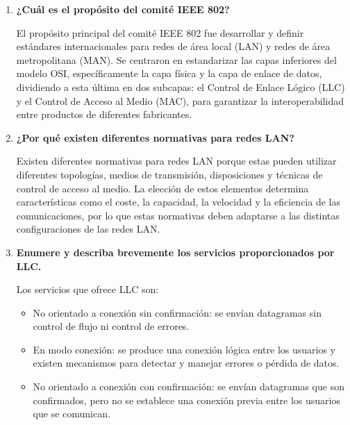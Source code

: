 \documentclass[11pt,a4paper]{article}
\begin{document}
\begin{enumerate}[label=15.\arabic*), itemsep=0.3cm]
\begin{itemize}
    \item \textbf{Estrella (Star):} Cada estación se conecta directamente a un nodo central de control mediante un enlace dedicado punto a punto. La comunicación entre dos estaciones se realiza obligatoriamente a través del dispositivo central, encargado de retransmitir el tráfico entrante hacia la línea del destinatario correspondiente.
    
    \item \textbf{Árbol (Tree):} Es una generalización de la topología en bus. El medio de transmisión es un cable ramificado sin bucles cerrados que comienza en un punto central llamado raíz. Las transmisiones emitidas por cualquier estación se propagan a través del medio a todas las ramas del árbol y pueden ser escuchadas por el resto de los dispositivos conectados.
\end{itemize}

  \item
  \textbf{¿Cuál es el propósito del comité IEEE 802?}

El propósito principal del comité IEEE 802 fue desarrollar y definir estándares internacionales para redes de área local (LAN) y redes de área metropolitana (MAN). Se centraron en estandarizar las capas inferiores del modelo OSI, específicamente la capa física y la capa de enlace de datos, dividiendo a esta última en dos subcapas: el Control de Enlace Lógico (LLC) y el Control de Acceso al Medio (MAC), para garantizar la interoperabilidad entre productos de diferentes fabricantes.

\item
\textbf{¿Por qué existen diferentes normativas para redes LAN?}

Existen diferentes normativas para redes LAN porque estas pueden utilizar diferentes topologías, medios de transmisión, disposiciones y técnicas de control de acceso al medio. La elección de estos elementos determina características como el coste, la capacidad, la velocidad y la eficiencia de las comunicaciones, por lo que estas normativas deben adaptarse a las distintas configuraciones de las redes LAN.

  \item
  \textbf{Enumere y describa brevemente los servicios proporcionados por LLC.}

  Los servicios que ofrece LLC son:
  \begin{itemize}
    \item No orientado a conexión sin confirmación: se envían datagramas sin control de flujo ni control de errores.
    \item En modo conexión: se produce una conexión lógica entre los usuarios y existen mecanismos para detectar y manejar errores o pérdida de datos.
    \item No orientado a conexión con confirmación: se envían datagramas que son confirmados, pero no se establece una conexión previa entre los usuarios que se comunican.
  \end{itemize}


\end{enumerate}
\end{document}
